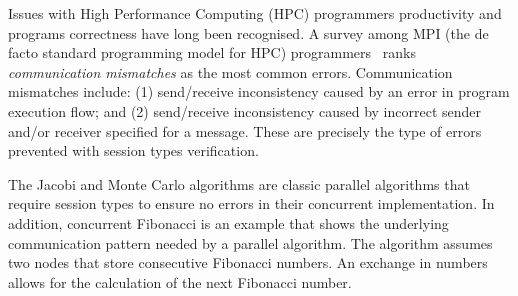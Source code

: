 

Issues with High Performance Computing (HPC)
programmers productivity and programs correctness
have long been recognised.
A survey among MPI (the de facto standard programming model for HPC)
programmers~\cite{MPIErrors} ranks
\textit{communication mismatches} as the most common errors.
Communication mismatches include:
(1) send/receive inconsistency caused by an error in
program execution flow; and
(2) send/receive inconsistency caused by incorrect
sender and/or receiver specified for a message.
These are precisely the type of errors prevented with
session types verification.

The Jacobi and Monte Carlo algorithms are classic parallel algorithms
that require session types to ensure no errors in their
concurrent implementation.
%
In addition, concurrent Fibonacci is an
example that shows the underlying communication
pattern needed by a parallel algorithm.
The algorithm assumes two nodes that store
consecutive Fibonacci numbers. An exchange
in numbers allows for the calculation of the
next Fibonacci number.





